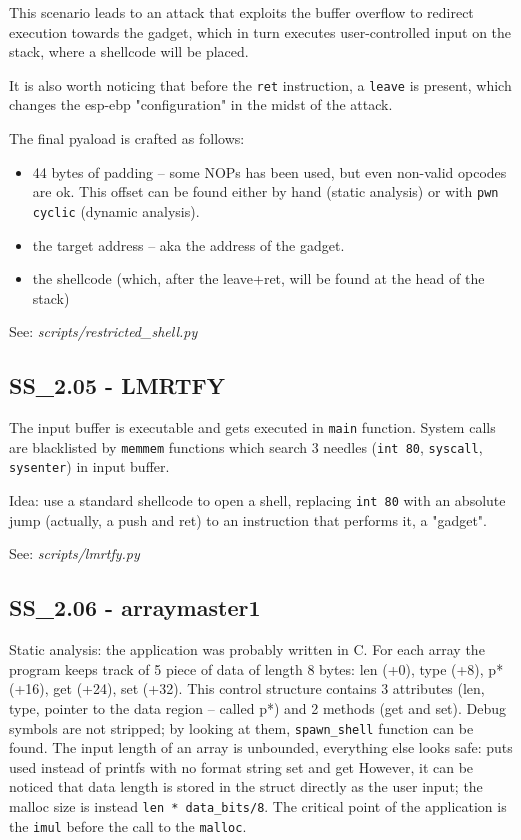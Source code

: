 This scenario leads to an attack that exploits the buffer overflow to redirect execution towards the gadget, which in turn executes user-controlled input on the stack, where a shellcode will be placed.

It is also worth noticing that before the \texttt{ret} instruction, a \texttt{leave} is present, which changes the esp-ebp "configuration" in the midst of the attack.

The final pyaload is crafted as follows:
\begin{itemize}
  \item 44 bytes of padding -- some NOPs has been used, but even non-valid opcodes are ok. This offset can be found either by hand (static analysis) or with \texttt{pwn cyclic} (dynamic analysis).
  \item the target address -- aka the address of the gadget.
  \item the shellcode (which, after the leave+ret, will be found at the head of the stack)
\end{itemize}

See: \textit{scripts/restricted_shell.py}

\subsection{SS_2.05 - LMRTFY}
The input buffer is executable and gets executed in \texttt{main} function.
System calls are blacklisted by \texttt{memmem} functions which search 3 needles (\texttt{int 80}, \texttt{syscall}, \texttt{sysenter}) in input buffer.

Idea: use a standard shellcode to open a shell, replacing \texttt{int 80} with an absolute jump (actually, a push and ret) to an instruction that performs it, a "gadget".

See: \textit{scripts/lmrtfy.py}

\subsection{SS_2.06 - arraymaster1}
Static analysis: the application was probably written in C.
For each array the program keeps track of 5 piece of data of length 8 bytes: len (+0), type (+8), p* (+16), get (+24), set (+32).
This control structure contains 3 attributes (len, type, pointer to the data region -- called p*) and 2 methods (get and set).
Debug symbols are not stripped; by looking at them, \texttt{spawn_shell} function can be found.
The input length of an array is unbounded, everything else looks safe: puts used instead of printfs with no format string set and get 
However, it can be noticed that data length is stored in the struct directly as the user input; the malloc size is instead \texttt{len * data_bits/8}. 
The critical point of the application is the \texttt{imul} before the call to the \texttt{malloc}.

